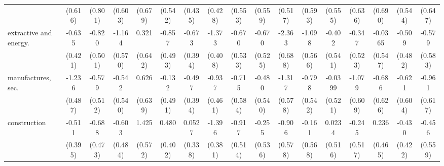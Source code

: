 {\begin{tabular}{l*{16}{c}}
                    &     (0.616)         &     (0.801)         &     (0.603)         &     (0.679)         &     (0.542)         &     (0.435)         &     (0.428)         &     (0.553)         &     (0.559)         &     (0.517)         &     (0.593)         &     (0.555)         &     (0.636)         &     (0.690)         &     (0.544)         &     (0.647)         \\
[1em]
extractive and energy.&      -0.635         &      -0.820         &      -1.164\sym{*}  &       0.321         &      -0.857         &      -0.673         &      -1.373\sym{***}&      -0.670         &      -0.670         &      -2.363\sym{***}&      -1.098         &      -0.402         &      -0.347         &     -0.0365         &      -0.509         &      -0.579         \\
                    &     (0.421)         &     (0.501)         &     (0.570)         &     (0.642)         &     (0.493)         &     (0.394)         &     (0.408)         &     (0.533)         &     (0.525)         &     (0.688)         &     (0.566)         &     (0.541)         &     (0.523)         &     (0.547)         &     (0.482)         &     (0.583)         \\
[1em]
manufactures, sec.  &      -1.236\sym{*}  &      -0.579         &      -0.542         &       0.626         &      -0.132         &      -0.497         &      -0.937\sym{*}  &      -0.715         &      -0.480         &      -1.317\sym{*}  &      -0.798         &     -0.0399         &      -1.079         &      -0.686         &      -0.621         &      -0.961         \\
                    &     (0.487)         &     (0.512)         &     (0.540)         &     (0.639)         &     (0.491)         &     (0.394)         &     (0.461)         &     (0.584)         &     (0.540)         &     (0.578)         &     (0.542)         &     (0.521)         &     (0.609)         &     (0.626)         &     (0.604)         &     (0.617)         \\
[1em]
construction        &      -0.511         &      -0.688         &      -0.603         &       1.425\sym{*}  &       0.480         &      0.0527         &      -1.396\sym{***}&      -0.917         &      -0.255         &      -0.906         &      -0.161         &      0.0234         &      -0.245         &       0.236         &      -0.430         &      -0.456         \\
                    &     (0.395)         &     (0.473)         &     (0.484)         &     (0.572)         &     (0.402)         &     (0.338)         &     (0.381)         &     (0.514)         &     (0.536)         &     (0.578)         &     (0.568)         &     (0.516)         &     (0.517)         &     (0.465)         &     (0.422)         &     (0.559)         \\

\end{tabular}}
